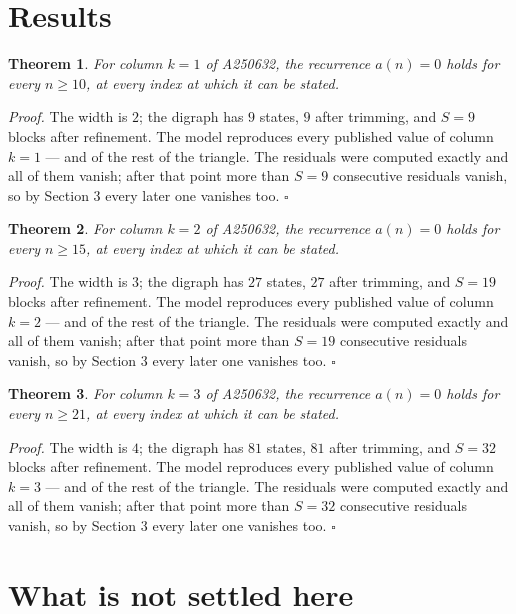 \documentclass[11pt]{article}
\newtheorem{theorem}{Theorem}
\theoremstyle{definition}
\begin{document}
\section{Results}

\begin{theorem} For column $k = 1$ of A250632, the recurrence $a(n) = 0$ holds for every $n \ge 10$, at every index at which it can be stated.\end{theorem}

{\itshape Proof.} The width is $2$; the digraph has $9$ states, $9$ after trimming, and $S = 9$ blocks after refinement. The model reproduces every published value of column $k = 1$ --- and of the rest of the triangle. The residuals were computed exactly and all of them vanish; after that point more than $S = 9$ consecutive residuals vanish, so by Section 3 every later one vanishes too. $\square$

\begin{theorem} For column $k = 2$ of A250632, the recurrence $a(n) = 0$ holds for every $n \ge 15$, at every index at which it can be stated.\end{theorem}

{\itshape Proof.} The width is $3$; the digraph has $27$ states, $27$ after trimming, and $S = 19$ blocks after refinement. The model reproduces every published value of column $k = 2$ --- and of the rest of the triangle. The residuals were computed exactly and all of them vanish; after that point more than $S = 19$ consecutive residuals vanish, so by Section 3 every later one vanishes too. $\square$

\begin{theorem} For column $k = 3$ of A250632, the recurrence $a(n) = 0$ holds for every $n \ge 21$, at every index at which it can be stated.\end{theorem}

{\itshape Proof.} The width is $4$; the digraph has $81$ states, $81$ after trimming, and $S = 32$ blocks after refinement. The model reproduces every published value of column $k = 3$ --- and of the rest of the triangle. The residuals were computed exactly and all of them vanish; after that point more than $S = 32$ consecutive residuals vanish, so by Section 3 every later one vanishes too. $\square$

\section{What is not settled here}
\end{document}

